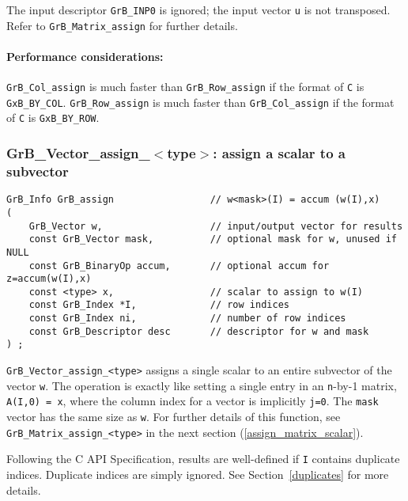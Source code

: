 \documentclass[12pt]{article}
\begin{document}
The input descriptor \verb'GrB_INP0' is ignored; the input vector \verb'u' is
not transposed.  Refer to \verb'GrB_Matrix_assign' for further details.

\paragraph{\bf Performance considerations:} %
\verb'GrB_Col_assign' is much faster than \verb'GrB_Row_assign' if the format
of \verb'C' is \verb'GxB_BY_COL'.  \verb'GrB_Row_assign' is much faster than
\verb'GrB_Col_assign' if the format of \verb'C' is \verb'GxB_BY_ROW'.

\newpage
\subsubsection{{\sf GrB\_Vector\_assign\_$<$type$>$:} assign a scalar to a subvector}
\label{assign_vector_scalar}

\begin{mdframed}[userdefinedwidth=6in]
{\footnotesize
\begin{verbatim}
GrB_Info GrB_assign                 // w<mask>(I) = accum (w(I),x)
(
    GrB_Vector w,                   // input/output vector for results
    const GrB_Vector mask,          // optional mask for w, unused if NULL
    const GrB_BinaryOp accum,       // optional accum for z=accum(w(I),x)
    const <type> x,                 // scalar to assign to w(I)
    const GrB_Index *I,             // row indices
    const GrB_Index ni,             // number of row indices
    const GrB_Descriptor desc       // descriptor for w and mask
) ;
\end{verbatim} } \end{mdframed}

\verb'GrB_Vector_assign_<type>' assigns a single scalar to an entire subvector
of the vector \verb'w'.  The operation is exactly like setting a single entry
in an \verb'n'-by-1 matrix, \verb'A(I,0) = x', where the column index for a
vector is implicitly \verb'j=0'.  The \verb'mask' vector has the same size as
\verb'w'.  For further details of this function, see
\verb'GrB_Matrix_assign_<type>' in the next section
(\ref{assign_matrix_scalar}).

Following the C API Specification, results are well-defined if \verb'I'
contains duplicate indices.  Duplicate indices are simply ignored.  See
Section~\ref{duplicates} for more details.
\end{document}
